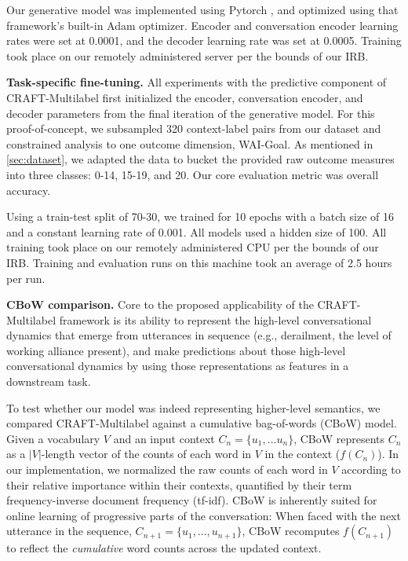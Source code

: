\documentclass{article}
\begin{document}
Our generative model was implemented using Pytorch \cite{paszke2019pytorch}, and optimized using that framework's built-in Adam optimizer. Encoder and conversation encoder learning rates were set at 0.0001, and the decoder learning rate was set at 0.0005. Training took place on our remotely administered server per the bounds of our IRB.

\textbf{Task-specific fine-tuning.} All experiments with the predictive component of CRAFT-Multilabel first initialized the encoder, conversation encoder, and decoder parameters from the final iteration of the generative model. For this proof-of-concept, we subsampled 320 context-label pairs from our dataset and constrained analysis to one outcome dimension, WAI-Goal. As mentioned in \ref{sec:dataset}, we adapted the data to bucket the provided raw outcome measures into three classes: 0-14, 15-19, and 20. Our core evaluation metric was overall accuracy. 

Using a train-test split of 70-30, we trained for 10 epochs with a batch size of 16 and a constant learning rate of 0.001. All models used a hidden size of 100. All training took place on our remotely administered CPU per the bounds of our IRB. Training and evaluation runs on this machine took an average of 2.5 hours per run.

\textbf{CBoW comparison.} Core to the proposed applicability of the CRAFT-Multilabel framework is its ability to represent the high-level conversational dynamics that emerge from utterances in sequence (e.g., derailment, the level of working alliance present), and make predictions about those high-level conversational dynamics by using those representations as features in a downstream task. 

To test whether our model was indeed representing higher-level semantics, we compared CRAFT-Multilabel against a cumulative bag-of-words (CBoW) model. Given a vocabulary $V$ and an input context $C_n=\{u_1,...u_n\}$, CBoW represents $C_n$ as a $|V|$-length vector of the counts of each word in $V$ in the context ($f(C_n)$). In our implementation, we normalized the raw counts of each word in $V$ according to their relative importance within their contexts, quantified by their term frequency-inverse document frequency (tf-idf). CBoW is inherently suited for online learning of progressive parts of the conversation: When faced with the next utterance in the sequence, $C_{n+1}=\{u_1,...,u_{n+1}\}$, CBoW recomputes $f(C_{n+1})$ to reflect the \textit{cumulative} word counts across the updated context.
\end{document}
